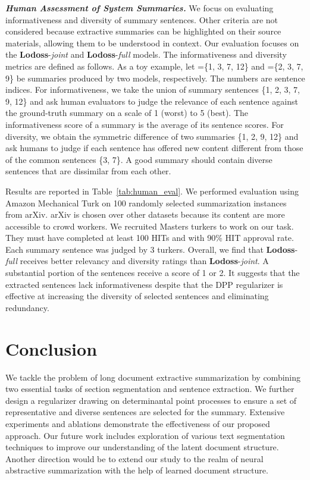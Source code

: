 \documentclass[11pt]{article}
\begin{document}
\vspace{0.05in}
\noindent\textbf{\textsl{Human Assessment of System Summaries.}}\quad
We focus on evaluating informativeness and diversity of summary sentences.
Other criteria are not considered because extractive summaries 
can be highlighted on their source materials, allowing them to be understood in context.
Our evaluation focuses on the \textbf{Lodoss}-\emph{joint} and \textbf{Lodoss}-\emph{full} models. 
The informativeness and diversity metrics are defined as follows.
As a toy example, let =\{1, 3, 7, 12\} and =\{2, 3, 7, 9\} be summaries produced by two models, respectively. 
The numbers are sentence indices.
For informativeness, we take the union of summary sentences
\{1, 2, 3, 7, 9, 12\}
and ask human evaluators to judge the relevance of each sentence
against the ground-truth summary
on a scale of 1 (worst) to 5 (best).
The informativeness score of a summary is the average of its sentence scores.
For diversity, we obtain the symmetric difference of two summaries 
\{1, 2, 9, 12\} and ask humans to judge if each sentence has offered new content different from those of the common sentences \{3, 7\}.
A good summary should contain diverse sentences that are dissimilar from each other.


Results are reported in Table~\ref{tab:human_eval}. 
We performed evaluation using Amazon Mechanical Turk on 100 randomly selected summarization instances from arXiv.
arXiv is chosen over other datasets because its content are more accessible to crowd workers. 
We recruited Masters turkers to work on our task.
They must have completed at least 100 HITs and with 90\% HIT approval rate.
Each summary sentence was judged by 3 turkers. 
Overall, we find that \textbf{Lodoss}-\emph{full} receives better relevancy and diversity ratings than \textbf{Lodoss}-\emph{joint}.
A substantial portion of the sentences receive a score of 1 or 2.
It suggests that the extracted sentences lack informativeness despite that the DPP regularizer is effective at increasing the diversity of selected sentences and eliminating redundancy. 


\section{Conclusion}

We tackle the problem of long document extractive summarization
by combining two essential tasks of section segmentation and sentence extraction.
We further design a regularizer drawing on determinantal point processes to 
ensure a set of representative and diverse sentences are selected for the summary.
Extensive experiments and ablations demonstrate the effectiveness of our proposed approach.
Our future work includes exploration of various text segmentation techniques to improve our understanding of the latent document structure. Another direction would be to extend our study to the realm of neural abstractive summarization with the help of learned document structure.
\end{document}
